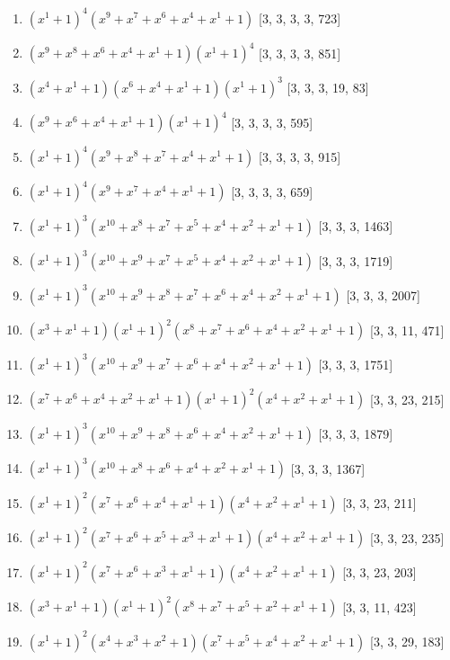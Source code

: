 \documentclass[10pt,twocolumn]{article}
\begin{document}
\begin{enumerate}
\item $(x^{1} + 1)^{4}(x^{9} + x^{7} + x^{6} + x^{4} + x^{1} + 1)$  [3, 3, 3, 3, 723]
\item $(x^{9} + x^{8} + x^{6} + x^{4} + x^{1} + 1)(x^{1} + 1)^{4}$  [3, 3, 3, 3, 851]
\item $(x^{4} + x^{1} + 1)(x^{6} + x^{4} + x^{1} + 1)(x^{1} + 1)^{3}$  [3, 3, 3, 19, 83]
\item $(x^{9} + x^{6} + x^{4} + x^{1} + 1)(x^{1} + 1)^{4}$  [3, 3, 3, 3, 595]
\item $(x^{1} + 1)^{4}(x^{9} + x^{8} + x^{7} + x^{4} + x^{1} + 1)$  [3, 3, 3, 3, 915]
\item $(x^{1} + 1)^{4}(x^{9} + x^{7} + x^{4} + x^{1} + 1)$  [3, 3, 3, 3, 659]
\item $(x^{1} + 1)^{3}(x^{10} + x^{8} + x^{7} + x^{5} + x^{4} + x^{2} + x^{1} + 1)$  [3, 3, 3, 1463]
\item $(x^{1} + 1)^{3}(x^{10} + x^{9} + x^{7} + x^{5} + x^{4} + x^{2} + x^{1} + 1)$  [3, 3, 3, 1719]
\item $(x^{1} + 1)^{3}(x^{10} + x^{9} + x^{8} + x^{7} + x^{6} + x^{4} + x^{2} + x^{1} + 1)$  [3, 3, 3, 2007]
\item $(x^{3} + x^{1} + 1)(x^{1} + 1)^{2}(x^{8} + x^{7} + x^{6} + x^{4} + x^{2} + x^{1} + 1)$  [3, 3, 11, 471]
\item $(x^{1} + 1)^{3}(x^{10} + x^{9} + x^{7} + x^{6} + x^{4} + x^{2} + x^{1} + 1)$  [3, 3, 3, 1751]
\item $(x^{7} + x^{6} + x^{4} + x^{2} + x^{1} + 1)(x^{1} + 1)^{2}(x^{4} + x^{2} + x^{1} + 1)$  [3, 3, 23, 215]
\item $(x^{1} + 1)^{3}(x^{10} + x^{9} + x^{8} + x^{6} + x^{4} + x^{2} + x^{1} + 1)$  [3, 3, 3, 1879]
\item $(x^{1} + 1)^{3}(x^{10} + x^{8} + x^{6} + x^{4} + x^{2} + x^{1} + 1)$  [3, 3, 3, 1367]
\item $(x^{1} + 1)^{2}(x^{7} + x^{6} + x^{4} + x^{1} + 1)(x^{4} + x^{2} + x^{1} + 1)$  [3, 3, 23, 211]
\item $(x^{1} + 1)^{2}(x^{7} + x^{6} + x^{5} + x^{3} + x^{1} + 1)(x^{4} + x^{2} + x^{1} + 1)$  [3, 3, 23, 235]
\item $(x^{1} + 1)^{2}(x^{7} + x^{6} + x^{3} + x^{1} + 1)(x^{4} + x^{2} + x^{1} + 1)$  [3, 3, 23, 203]
\item $(x^{3} + x^{1} + 1)(x^{1} + 1)^{2}(x^{8} + x^{7} + x^{5} + x^{2} + x^{1} + 1)$  [3, 3, 11, 423]
\item $(x^{1} + 1)^{2}(x^{4} + x^{3} + x^{2} + 1)(x^{7} + x^{5} + x^{4} + x^{2} + x^{1} + 1)$  [3, 3, 29, 183]

\end{enumerate}
\end{document}
